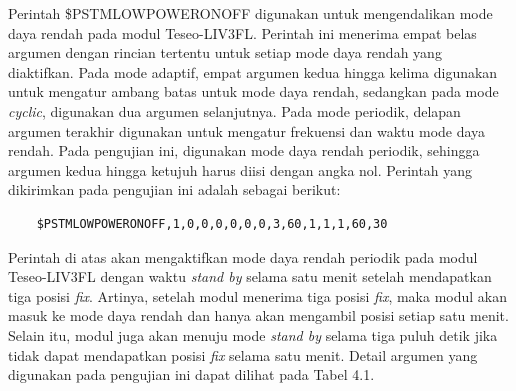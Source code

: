 Perintah \$PSTMLOWPOWERONOFF digunakan untuk mengendalikan mode daya rendah pada modul Teseo-LIV3FL. Perintah ini menerima empat belas argumen dengan rincian tertentu untuk setiap mode daya rendah yang diaktifkan. Pada mode adaptif, empat argumen kedua hingga kelima digunakan untuk mengatur ambang batas untuk mode daya rendah, sedangkan pada mode \textit{cyclic}, digunakan dua argumen selanjutnya. Pada mode periodik, delapan argumen terakhir digunakan untuk mengatur frekuensi dan waktu mode daya rendah. Pada pengujian ini, digunakan mode daya rendah periodik, sehingga argumen kedua hingga ketujuh harus diisi dengan angka nol. Perintah yang dikirimkan pada pengujian ini adalah sebagai berikut:

\begin{verbatim}
	$PSTMLOWPOWERONOFF,1,0,0,0,0,0,0,3,60,1,1,1,60,30
\end{verbatim}

Perintah di atas akan mengaktifkan mode daya rendah periodik pada modul Teseo-LIV3FL dengan waktu \textit{stand by} selama satu menit setelah mendapatkan tiga posisi \textit{fix}. Artinya, setelah modul menerima tiga posisi \textit{fix}, maka modul akan masuk ke mode daya rendah dan hanya akan mengambil posisi setiap satu menit. Selain itu, modul juga akan menuju mode \textit{stand by} selama tiga puluh detik jika tidak dapat mendapatkan posisi \textit{fix} selama satu menit. Detail argumen yang digunakan pada pengujian ini dapat dilihat pada Tabel 4.1.


